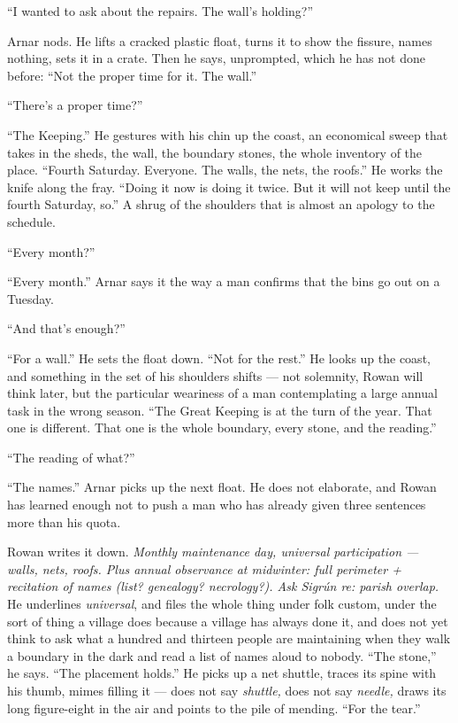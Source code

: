\documentclass[11pt,oneside]{book}
\begin{document}
``I wanted to ask about the repairs. The wall's holding?''

Arnar nods. He lifts a cracked plastic float, turns it to show the
fissure, names nothing, sets it in a crate. Then he says, unprompted,
which he has not done before: ``Not the proper time for it. The wall.''

``There's a proper time?''

``The Keeping.'' He gestures with his chin up the coast, an economical
sweep that takes in the sheds, the wall, the boundary stones, the whole
inventory of the place. ``Fourth Saturday. Everyone. The walls, the
nets, the roofs.'' He works the knife along the fray. ``Doing it now is
doing it twice. But it will not keep until the fourth Saturday, so.'' A
shrug of the shoulders that is almost an apology to the schedule.

``Every month?''

``Every month.'' Arnar says it the way a man confirms that the bins go
out on a Tuesday.

``And that's enough?''

``For a wall.'' He sets the float down. ``Not for the rest.'' He looks
up the coast, and something in the set of his shoulders shifts --- not
solemnity, Rowan will think later, but the particular weariness of a man
contemplating a large annual task in the wrong season. ``The Great
Keeping is at the turn of the year. That one is different. That one is
the whole boundary, every stone, and the reading.''

``The reading of what?''

``The names.'' Arnar picks up the next float. He does not elaborate, and
Rowan has learned enough not to push a man who has already given three
sentences more than his quota.

Rowan writes it down. \emph{Monthly maintenance day, universal
participation --- walls, nets, roofs. Plus annual observance at
midwinter: full perimeter + recitation of names (list? genealogy?
necrology?). Ask Sigrún re: parish overlap.} He underlines
\emph{universal}, and files the whole thing under folk custom, under the
sort of thing a village does because a village has always done it, and
does not yet think to ask what a hundred and thirteen people are
maintaining when they walk a boundary in the dark and read a list of
names aloud to nobody. ``The stone,'' he says.
``The placement holds.'' He picks up a net shuttle, traces its spine
with his thumb, mimes filling it --- does not say \emph{shuttle,} does
not say \emph{needle,} draws its long figure-eight in the air and points
to the pile of mending. ``For the tear.''
\end{document}
